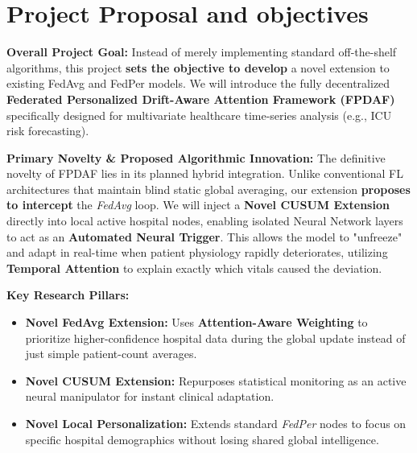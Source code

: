 \documentclass[11pt, a4paper]{article}
\begin{document}
\vspace{0.3cm}


\section{Project Proposal and objectives}
\textbf{Overall Project Goal:} Instead of merely implementing standard off-the-shelf algorithms, this project \textbf{sets the objective to develop} a novel extension to existing FedAvg and FedPer models. We will introduce the fully decentralized \textbf{Federated Personalized Drift-Aware Attention Framework (FPDAF)} specifically designed for multivariate healthcare time-series analysis (e.g., ICU risk forecasting).

\vspace{0.2cm}
\textbf{Primary Novelty \& Proposed Algorithmic Innovation:} 
The definitive novelty of FPDAF lies in its planned hybrid integration. Unlike conventional FL architectures that maintain blind static global averaging, our extension \textbf{proposes to intercept} the \textit{FedAvg} loop. We will inject a \textbf{Novel CUSUM Extension} directly into local active hospital nodes, enabling isolated Neural Network layers to act as an \textbf{Automated Neural Trigger}. This allows the model to "unfreeze" and adapt in real-time when patient physiology rapidly deteriorates, utilizing \textbf{Temporal Attention} to explain exactly which vitals caused the deviation.

\vspace{0.2cm}
\textbf{Key Research Pillars:}
\begin{itemize}[noitemsep, leftmargin=1.5em]
    \item \textbf{Novel FedAvg Extension:} Uses \textbf{Attention-Aware Weighting} to prioritize higher-confidence hospital data during the global update instead of just simple patient-count averages.
    \item \textbf{Novel CUSUM Extension:} Repurposes statistical monitoring as an active neural manipulator for instant clinical adaptation.
    \item \textbf{Novel Local Personalization:} Extends standard \textit{FedPer} nodes to focus on specific hospital demographics without losing shared global intelligence.
\end{itemize}
\end{document}
